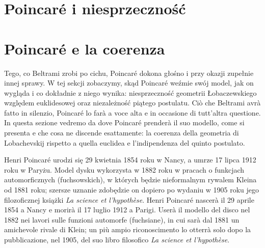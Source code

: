 
\section{Poincaré i niesprzeczność} %
\section{Poincaré e la coerenza} %
\label{sekcja_poincare}

Tego, co Beltrami zrobi po cichu, Poincaré dokona głośno i przy okazji zupełnie innej sprawy. %
W tej sekcji zobaczymy, skąd Poincaré weźmie swój model, jak on wygląda i co dokładnie z niego wynika: niesprzeczność geometrii Łobaczewskiego względem euklidesowej oraz niezależność piątego postulatu. %
Ciò che Beltrami avrà fatto in silenzio, Poincaré lo farà a voce alta e in occasione di tutt'altra questione. %
In questa sezione vedremo da dove Poincaré prenderà il suo modello, come si presenta e che cosa ne discende esattamente: la coerenza della geometria di Lobachevskij rispetto a quella euclidea e l'indipendenza del quinto postulato. %

Henri Poincaré urodzi się 29 kwietnia 1854 roku w Nancy, a umrze 17 lipca 1912 roku w Paryżu. %
Model dysku wykorzysta w 1882 roku w pracach o funkcjach automorficznych (fuchsowskich), w których będzie nieformalnym rywalem Kleina od 1881 roku; szersze uznanie zdobędzie on dopiero po wydaniu w 1905 roku jego filozoficznej książki \emph{La science et l'hypothèse}. %
Henri Poincaré nascerà il 29 aprile 1854 a Nancy e morirà il 17 luglio 1912 a Parigi. %
Userà il modello del disco nel 1882 nei lavori sulle funzioni automorfe (fuchsiane), in cui sarà dal 1881 un amichevole rivale di Klein; un più ampio riconoscimento lo otterrà solo dopo la pubblicazione, nel 1905, del suo libro filosofico \emph{La science et l'hypothèse}. %
%

